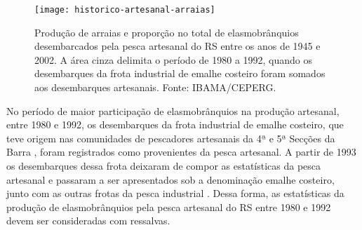 \documentclass[a4paper,11pt,twoside,showtrims,onecolumn,openright,final]{memoir}
\begin{document}
\begin{figure}
\begin{center}
\texttt{[image: historico-artesanal-arraias]}
\end{center}
\caption[Produção de arraias e proporção no total de elasmobrânquios 
         desembarcados pela pesca artesanal do RS entre os anos de 1945 e 2002]
        {Produção de arraias e proporção no total de elasmobrânquios 
         desembarcados pela pesca artesanal do RS entre os anos de 1945 e 2002.
	 A área cinza delimita o período de 1980 a 1992, quando os 
	 desembarques da frota industrial de emalhe costeiro foram 
	 somados aos desembarques artesanais.
	 Fonte: IBAMA/CEPERG.}
\label{fig:historico-artesanal-arraias}	 
\end{figure}


\enlargethispage{-\baselineskip}

No período de maior participação de elasmobrânquios na produção artesanal, 
entre 1980 e 1992, os desembarques da frota industrial de emalhe costeiro,
que teve origem nas comunidades de pescadores artesanais da 4ª e 5ª Secções da Barra
\citep{silva1990,BARCELLOS1991,REIS1994}, foram registrados como provenientes da 
pesca artesanal. A partir de 1993 os desembarques dessa frota deixaram de compor as 
estatísticas da pesca artesanal e passaram a ser apresentados sob a denominação emalhe 
costeiro, junto com as outras frotas da pesca industrial \citep{ceperg1996}.
Dessa forma, as estatísticas da produção de elasmobrânquios pela pesca artesanal 
do RS entre 1980 e 1992 devem ser consideradas com ressalvas.




\end{document}
